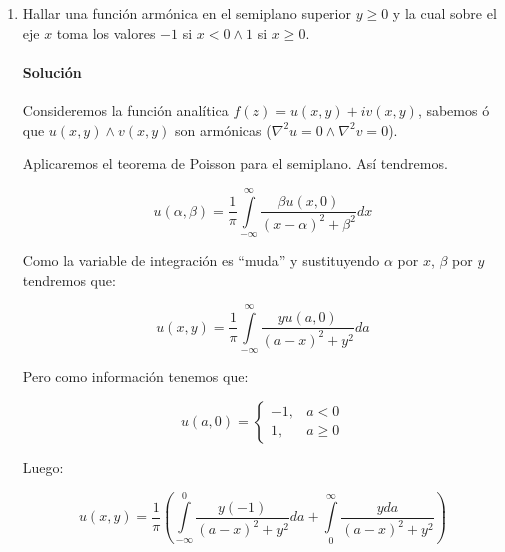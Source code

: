\documentclass[a4paper,12pt]{article}
\begin{document}
\begin{enumerate}
Aplicando Poisson para el círculo tendremos:

\[
\int\limits_{0}^{2\pi} \frac{e^{2 \cos \theta} \cos(2 \sin \phi)}{5 - 4 \cos(\theta - \phi)} d\phi = \frac{1}{3} \int\limits_{0}^{2\pi} \frac{3 e^{2 \cos \theta} \cos(2 \sin \phi)}{5 - 4 \cos(\theta - \phi)} d\phi
\]

\[
= \frac{2\pi}{3} \left( \frac{1}{2\pi} \int\limits_{0}^{2\pi} \frac{3 e^{2 \cos \theta} \cos(2 \sin \phi)}{5 - 4 \cos(\theta - \phi) + 1} d\phi \right)
\]

\[
= \frac{2\pi}{3} e^{2 \cos \theta} \cos(\sin \theta)
\]

$f(Re^{i\theta}) = e^{R \cos \theta} \cos(R \sin \phi)$, así tenemos $f(e^{i\theta}) = e^{2 \cos \theta} \cos(\sin \theta)$ esto justifica el último cálculo.

\item Hallar una función armónica en el semiplano superior $y \geq 0$ y la cual sobre el eje $x$ toma los valores $-1$ si $x < 0 \wedge 1$ si $x \geq 0$.

\paragraph{Solución}

Consideremos la función analítica $f(z) = u(x, y) + iv(x, y)$, sabemos ó que $u(x, y) \wedge v(x, y)$ son armónicas ($\nabla^2 u = 0 \wedge \nabla^2 v = 0$).

Aplicaremos el teorema de Poisson para el semiplano. Así tendremos.


\[
u(\alpha, \beta) = \frac{1}{\pi} \int\limits_{-\infty}^{\infty} \frac{\beta u(x, 0)}{(x - \alpha)^2 + \beta^2} dx
\]

Como la variable de integración es “muda” y sustituyendo $\alpha$ por $x$, $\beta$ por $y$ tendremos que:

\[
u(x, y) = \frac{1}{\pi} \int\limits_{-\infty}^{\infty} \frac{y u(a, 0)}{(a - x)^2 + y^2} da
\]

Pero como información tenemos que:

\[
u(a, 0) = \begin{cases}
-1, & a < 0 \\
1, & a \geq 0
\end{cases}
\]

Luego:

\[
u(x, y) = \frac{1}{\pi} \left( \int\limits_{-\infty}^{0} \frac{y(-1)}{(a - x)^2 + y^2} da + \int\limits_{0}^{\infty} \frac{y da}{(a - x)^2 + y^2} \right)
\]


\end{enumerate}
\end{document}

